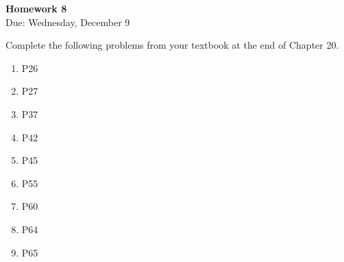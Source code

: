 \documentclass{article}
\begin{document}
\fancyfoot[C]{\thepage}
\vspace*{0cm}
\begin{center}
	{\LARGE \textbf{Homework 8}}\\
	\vspace{0.25cm}
	{\Large Due: Wednesday, December 9}
\end{center}

Complete the following problems from your textbook at the end of Chapter 20.
\begin{enumerate}
\item P26
\item P27
\item P37
\item P42
\item P45
\item P55
\item P60
\item P64
\item P65

\end{enumerate}
\end{document}
